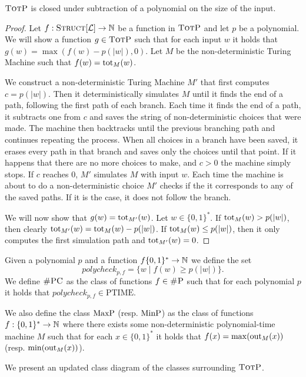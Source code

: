 \begin{theo}
	$\textsc{TotP}$ is closed under subtraction of a polynomial on the size of the input.
\end{theo}
\begin{proof}
	Let $f:\textsc{Struct}[{\cal L}]\to\mathbb{N}$ be a function in $\textsc{TotP}$ and let $p$ be a polynomial. We will show a function $g\in\textsc{TotP}$ such that for each input $w$ it holds that $g(w) = \max(f(w) - p(\vert w \vert),0)$. Let $M$ be the non-deterministic Turing Machine such that $f(w) = \text{tot}_M(w)$. 
	
	We construct a non-deterministic Turing Machine $M'$ that first computes $c = p(\vert w \vert)$. Then it deterministically simulates $M$ until it finds the end of a path, following the first path of each branch. Each time it finds the end of a path, it subtracts one from $c$ and saves the string of non-deterministic choices that were made. The machine then backtracks until the previous branching path and continues repeating the process. When all choices in a branch have been saved, it erases every path in that branch and saves only the choices until that point. If it happens that there are no more choices to make, and $c > 0$ the machine simply stops. If $c$ reaches 0, $M'$ simulates $M$ with input $w$. Each time the machine is about to do a non-deterministic choice $M'$ checks if the it corresponds to any of the saved paths. If it is the case, it does not follow the branch.
	
	We will now show that $g(w) = \text{tot}_{M'}(w)$. Let $w\in\{0,1\}^*$. If $\text{tot}_{M}(w) > p(\vert w \vert)$, then clearly $\text{tot}_{M'}(w) = \text{tot}_{M}(w) - p(\vert w \vert)$. If $\text{tot}_{M}(w) \leq p(\vert w \vert)$, then it only computes the first simulation path and $\text{tot}_{M'}(w) = 0$.
\end{proof}

Given a polynomial $p$ and a function $f\{0,1\}^*\to\mathbb{N}$ we define the set
\[
	polycheck_{p,f} = \{w\mid f(w) \geq p(\vert w \vert) \}.
\]
We define $\textsc{\#PC}$ as the class of functions $f\in\textsc{\#P}$ such that for each polynomial $p$ it holds that $polycheck_{p,f}\in \text{PTIME}$.

We also define the class $\text{MaxP}$ (resp. $\text{MinP}$) as the class of functions $f:\{0,1\}^* \to \mathbb{N}$ where there exists some non-deterministic polynomial-time machine $M$ such that for each $x\in\{0,1\}^*$ it holds that $f(x) = \max(\text{out}_M(x))$ (resp. $\min(\text{out}_M(x))$).

We present an updated class diagram of the classes surrounding $\textsc{TotP}$.



